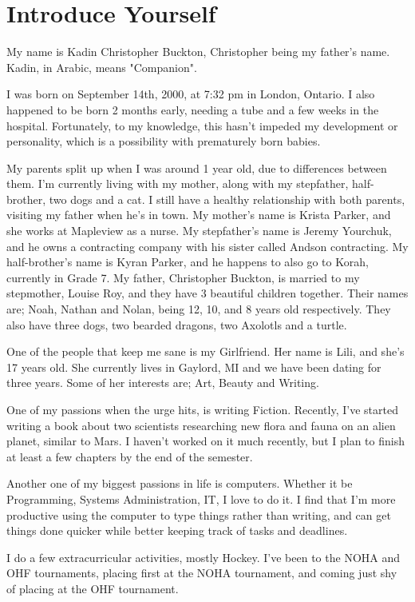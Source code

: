 \documentclass[11pt]{article}
\date{\today}
\title{}
\begin{document}
\section*{Introduce Yourself}
\label{sec:orgb195cab}
My name is Kadin Christopher Buckton, Christopher being my father's name. Kadin, in Arabic, means "Companion". 

I was born on September 14th, 2000, at 7:32 pm in London, Ontario. I also happened to be born 2 months early, needing a tube and a few weeks in the hospital. Fortunately, to my knowledge, this hasn't impeded my development or personality, which is a possibility with prematurely born babies. 

My parents split up when I was around 1 year old, due to differences between them. I'm currently living with my mother, along with my stepfather, half-brother, two dogs and a cat. I still have a healthy relationship with both parents, visiting my father when he's in town. My mother's name is Krista Parker, and she works at Mapleview as a nurse. My stepfather's name is Jeremy Yourchuk, and he owns a contracting company with his sister called Andson contracting. My half-brother's name is Kyran Parker, and he happens to also go to Korah, currently in Grade 7. My father, Christopher Buckton, is married to my stepmother,  Louise Roy, and they have 3 beautiful children together. Their names are; Noah, Nathan and Nolan, being 12, 10, and 8 years old respectively. They also have three dogs, two bearded dragons, two Axolotls and a turtle.

One of the people that keep me sane is my Girlfriend. Her name is Lili, and she's 17 years old. She currently lives in Gaylord, MI and we have been dating for three years. Some of her interests are; Art, Beauty and Writing.

One of my passions when the urge hits, is writing Fiction. Recently, I've started writing a book about two scientists researching new flora and fauna on an alien planet, similar to Mars. I haven't worked on it much recently, but I plan to finish at least a few chapters by the end of the semester.

Another one of my biggest passions in life is computers. Whether it be Programming, Systems Administration, IT, I love to do it. I find that I'm more productive using the computer to type things rather than writing, and can get things done quicker while better keeping track of tasks and deadlines. 

I do a few extracurricular activities, mostly Hockey. I've been to the NOHA and OHF tournaments, placing first at the NOHA tournament, and coming just shy of placing at the OHF tournament.
\end{document}

